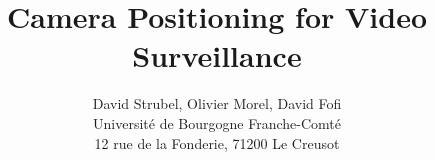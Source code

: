 
\title{Camera Positioning for Video Surveillance}

\author{David Strubel, Olivier Morel, David Fofi\\
Universit\'e de Bourgogne Franche-Comt\'e\\
12 rue de la Fonderie, 71200 Le Creusot}
